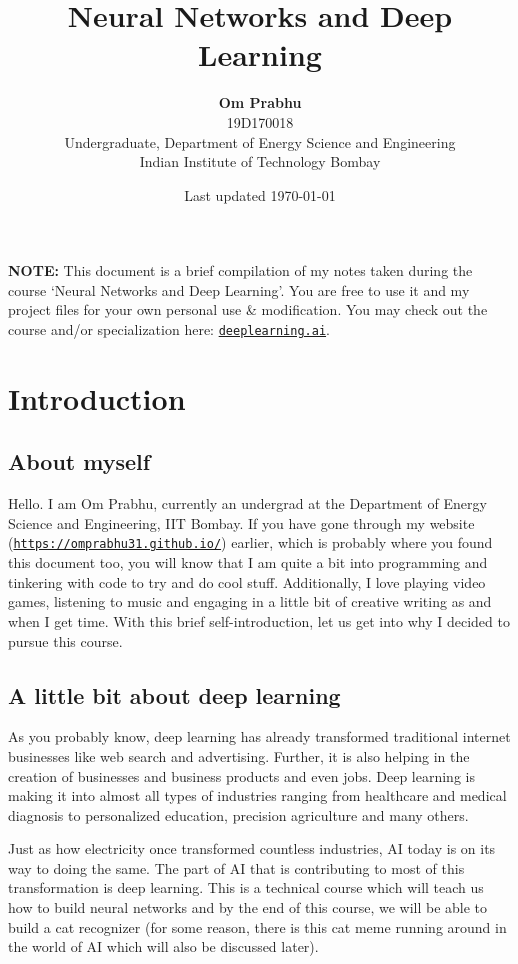 \documentclass{article}[a4paper,12pt]
\title{\textbf{Neural Networks and Deep Learning}}
\author{
	\textbf{Om Prabhu}\\
	19D170018\\
	Undergraduate, Department of Energy Science and Engineering\\
	Indian Institute of Technology Bombay\\}
\date{Last updated \today}
\theoremstyle{definition}
\begin{document}
\maketitle
\vspace{-12pt}
\hrulefill
\vspace{6pt}

\textbf{NOTE:} This document is a brief compilation of my notes taken during the course `Neural Networks and Deep Learning'. You are free to use it and my project files for your own personal use \& modification. You may check out the course and/or specialization here: \texttt{\href{https://www.deeplearning.ai/}{deeplearning.ai}}.

\hrulefill
\tableofcontents
\vspace{6pt}

\hrulefill
\pagebreak

\section{Introduction}
\subsection{About myself}
Hello. I am Om Prabhu, currently an undergrad at the Department of Energy Science and Engineering, IIT Bombay. If you have gone through my website (\texttt{\href{https://omprabhu31.github.io/}{https://omprabhu31.github.io/}}) earlier, which is probably where you found this document too, you will know that I am quite a bit into programming and tinkering with code to try and do cool stuff. Additionally, I love playing video games, listening to music and engaging in a little bit of creative writing as and when I get time. With this brief self-introduction, let us get into why I decided to pursue this course.
\subsection{A little bit about deep learning}
As you probably know, deep learning has already transformed traditional internet businesses like web search and advertising. Further, it is also helping in the creation of businesses and business products and even jobs. Deep learning is making it into almost all types of industries ranging from healthcare and medical diagnosis to personalized education, precision agriculture and many others. 
\vspace{6pt}

Just as how electricity once transformed countless industries, AI today is on its way to doing the same. The part of AI that is contributing to most of this transformation is deep learning. This is a technical course which will teach us how to build neural networks and by the end of this course, we will be able to build a cat recognizer (for some reason, there is this cat meme running around in the world of AI which will also be discussed later).
\end{document}
